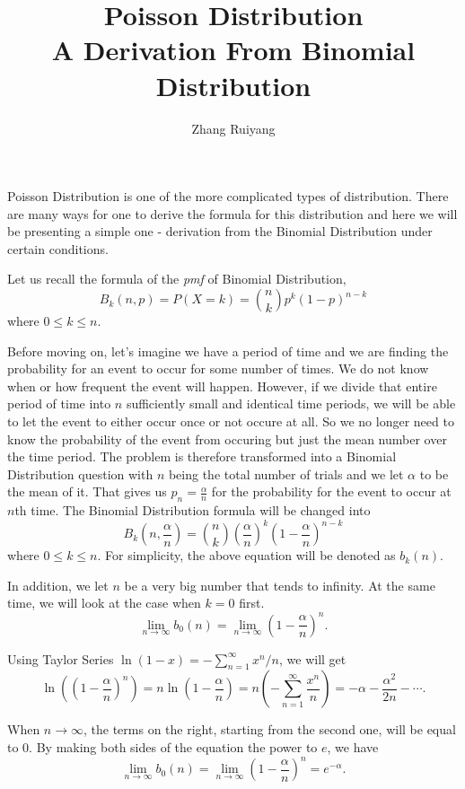 \documentclass{article}
\title{Poisson Distribution\\
	\large A Derivation From Binomial Distribution}
\author{Zhang Ruiyang}
\date{}
\theoremstyle{definition}
\begin{document}
\maketitle

\noindent Poisson Distribution is one of the more complicated types of distribution. There are many ways for one to derive the formula for this distribution and here we will be presenting a simple one - derivation from the Binomial Distribution under certain conditions.

\bigskip

\noindent Let us recall the formula of the \emph{pmf} of Binomial Distribution, 
\[
B_k(n,p) = P(X= k) = {n \choose k}p^k (1-p)^{n-k}
\]
where $0 \le k \le n$.

\bigskip

\noindent Before moving on, let's imagine we have a period of time and we are finding the probability for an event to occur for some number of times. We do not know when or how frequent the event will happen. However, if we divide that entire period of time into $n$ sufficiently small and identical time periods, we will be able to let the event to either occur once or not occure at all. So we no longer need to know the probability of the event from occuring but just the mean number over the time period. The problem is therefore transformed into a Binomial Distribution question with $n$ being the total number of trials and we let $\alpha$ to be the mean of it. That gives us $p_n = \frac{\alpha}{n}$ for the probability for the event to occur at $n$th time. The Binomial Distribution formula will be changed into
\[
B_k(n,\frac{\alpha}{n}) = {n \choose k}(\frac{\alpha}{n})^k (1-\frac{\alpha}{n})^{n-k}
\]
where $0 \le k \le n$. For simplicity, the above equation will be denoted as $b_k(n)$.

\bigskip

\noindent In addition, we let $n$ be a very big number that tends to infinity. At the same time, we will look at the case when $k = 0$ first.
\[
\lim_{n \to \infty} b_0(n) = \lim_{n \to \infty} (1-\frac{\alpha}{n})^{n}.
\]

\bigskip

\noindent Using Taylor Series $\ln (1-x) = - \sum^{\infty}_{n=1} x^n / n$, we will get
\[
\ln ((1-\frac{\alpha}{n})^{n}) = n \ln (1-\frac{\alpha}{n}) = n(- \sum^{\infty}_{n=1} \frac{x^n}{n}) = -\alpha - \frac{\alpha^2}{2n} - \cdots.
\]

\bigskip

\noindent When $n \to \infty$, the terms on the right, starting from the second one, will be equal to 0. By making both sides of the equation the power to $e$, we have
\[
\lim_{n \to \infty} b_0(n) = \lim_{n \to \infty} (1-\frac{\alpha}{n})^{n} = e^{-\alpha}.
\]
\end{document}
